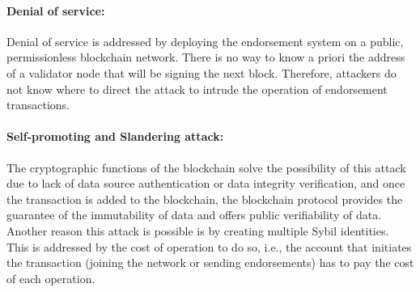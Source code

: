 \paragraph{Denial of service:} Denial of service is addressed by deploying the
endorsement system on a public, permissionless blockchain network. There is no
way to know a priori the address of a validator node that will be signing the
next block. Therefore, attackers do not know where to direct the attack to
intrude the operation of endorsement transactions. 
\paragraph{Self-promoting and Slandering attack:}The cryptographic functions of
the blockchain solve the possibility of this attack due to lack of data source
authentication or data integrity verification, and once the transaction is
added to the blockchain, the blockchain protocol provides the guarantee of the
immutability of data and offers public verifiability of data. Another reason
this attack is possible is by creating multiple Sybil identities. This is
addressed by the cost of operation to do so, i.e., the account that initiates
the transaction (joining the network or sending endorsements) has to pay the
cost of each operation.   
